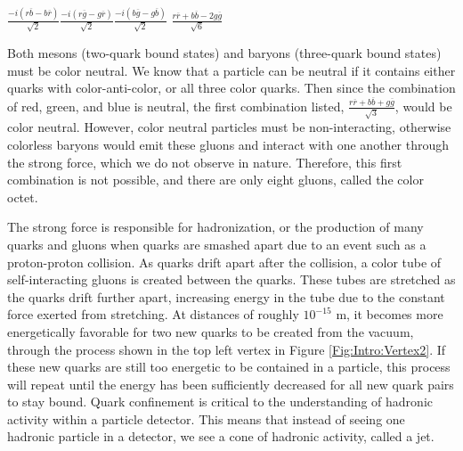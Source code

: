 {\centering  

    $\frac{-i(r\overline{b} - b\overline{r})}{\sqrt{2}}$\hspace{1cm}$\frac{-i(r\overline{g} - g\overline{r})}{\sqrt{2}}$\hspace{1cm}$\frac{-i(b\overline{g} - g\overline{b})}{\sqrt{2}}$ \hspace{1cm}$\frac{r\overline{r} + b\overline{b} -2g\overline{g}}{\sqrt{6}}$
    
    }

Both mesons (two-quark bound states) and baryons (three-quark bound states) must be color neutral. We know that a particle can be neutral if it contains either quarks with color-anti-color, or all three color quarks. Then since the combination of red, green, and blue is neutral, the first combination listed, $\frac{r\overline{r} + b\overline{b} + g\overline{g}}{\sqrt{3}}$, would be color neutral. However, color neutral particles must be non-interacting, otherwise colorless baryons would emit these gluons and interact with one another through the strong force, which we do not observe in nature. Therefore, this first combination is not possible, and there are only eight gluons, called the color octet.

The strong force is responsible for hadronization, or the production of many quarks and gluons when quarks are smashed apart due to an event such as a proton-proton collision. As quarks drift apart after the collision, a color tube of self-interacting gluons is created between the quarks. These tubes are stretched as the quarks drift further apart, increasing energy in the tube due to the constant force exerted from stretching. At distances of roughly $10^{-15}$ m, it becomes more energetically favorable for two new quarks to be created from the vacuum, through the process shown in the top left vertex in Figure \ref{Fig:Intro:Vertex2}. If these new quarks are still too energetic to be contained in a particle, this process will repeat until the energy has been sufficiently decreased for all new quark pairs to stay bound. Quark confinement is critical to the understanding of hadronic activity within a particle detector. This means that instead of seeing one hadronic particle in a detector, we see a cone of hadronic activity, called a jet.

